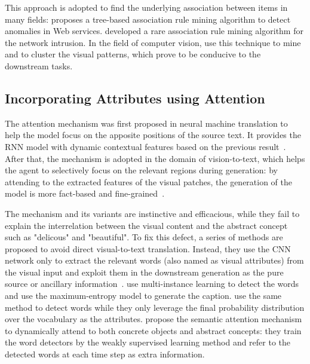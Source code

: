 \documentclass[sigconf]{acmart}
\begin{document}
This approach is adopted to find the underlying association between items in many fields: \cite{Esfahani16} proposes a tree-based association rule mining algorithm to detect anomalies in Web services. \cite{Kong16} developed a rare association rule mining algorithm for the network intrusion. In the field of computer vision, \cite{li2015mid} use this technique to mine and to cluster the visual patterns, which prove to be conducive to the downstream tasks.  

\subsection{Incorporating Attributes using Attention}
The attention mechanism was first proposed in neural machine translation to help the model focus on the apposite positions of the source text. It provides the RNN model with dynamic contextual features based on the previous result~\cite{Bahdanau14, luong2015effective, Firat16}. After that, the mechanism is adopted in the domain of vision-to-text, which helps the agent to selectively focus on the relevant regions during generation: by attending to the extracted features of the visual patches, the generation of the model is more fact-based and fine-grained~\cite{Bahdanau14, xu2015show, Chen17}. 

The mechanism and its variants are instinctive and efficacious, while they fail to explain the interrelation between the visual content and the abstract concept such as "delicous" and "beautiful". To fix this defect, a series of methods are proposed to avoid direct visual-to-text translation. Instead, they use the CNN network only to extract the relevant words (also named as visual attributes) from the visual input and exploit them in the downstream generation as the pure source or ancillary information~\cite{chen2018show, yao2017boosting, you2016image}. \cite{fang2015captions} use multi-instance learning to detect the words and use the maximum-entropy model to generate the caption. \cite{yao2017boosting} use the same method to detect words while they only leverage the final probability distribution over the vocabulary as the attributes. \cite{you2016image} propose the semantic attention mechanism to dynamically attend to both concrete objects and abstract concepts: they train the word detectors by the weakly supervised learning method and refer to the detected words at each time step as extra information. 
\end{document}
